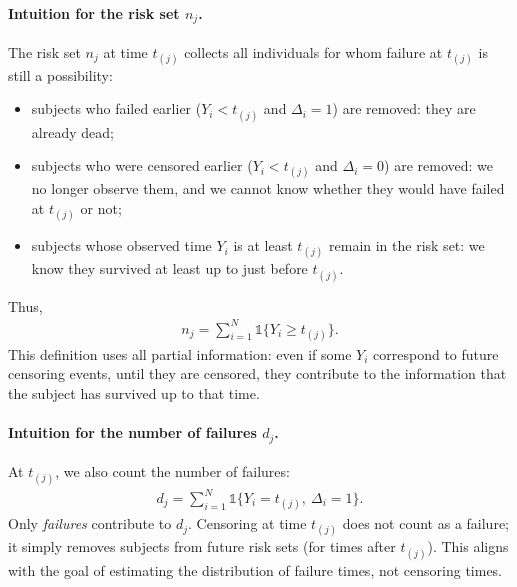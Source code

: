 \documentclass{article}
\theoremstyle{plain}
\theoremstyle{definition}
\theoremstyle{remark}
\def\mbone{\mathds{1}}
\begin{document}
\paragraph{Intuition for the risk set $n_j$.}
The risk set $n_j$ at time $t_{(j)}$ collects all individuals for whom failure at $t_{(j)}$ is still a possibility:
\begin{itemize}
    \item subjects who failed earlier ($Y_i < t_{(j)}$ and $\Delta_i=1$) are removed: they are already dead;
    \item subjects who were censored earlier ($Y_i < t_{(j)}$ and $\Delta_i=0$) are removed: we no longer observe them, and we cannot know whether they would have failed at $t_{(j)}$ or not;
    \item subjects whose observed time $Y_i$ is at least $t_{(j)}$ remain in the risk set: we know they survived at least up to just before $t_{(j)}$.
\end{itemize}
Thus,
\begin{align}
    n_j = \sum_{i=1}^N \mbone\{Y_i \ge t_{(j)}\}.
\end{align}
This definition uses all partial information: even if some $Y_i$ correspond to future censoring events, until they are censored, they contribute to the information that the subject has survived up to that time.

\paragraph{Intuition for the number of failures $d_j$.}
At $t_{(j)}$, we also count the number of failures:
\begin{align}
d_j 
= \sum_{i=1}^N \mbone\{Y_i = t_{(j)},\ \Delta_i = 1\}.
\end{align}
Only \emph{failures} contribute to $d_j$. Censoring at time $t_{(j)}$ does not count as a failure; it simply removes subjects from future risk sets (for times after $t_{(j)}$). This aligns with the goal of estimating the distribution of failure times, not censoring times.

\end{document}
